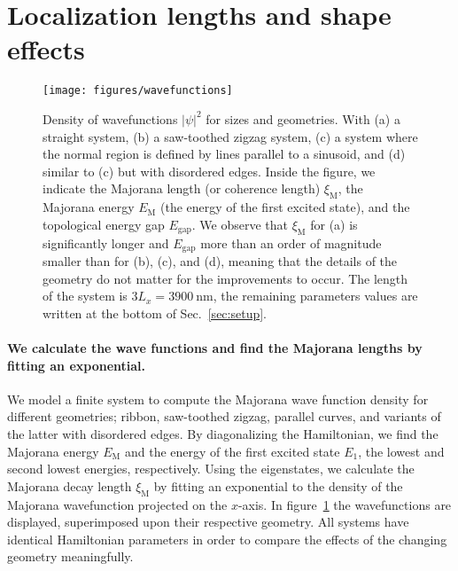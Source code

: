 \documentclass[english, twocolumn, 10pt, aps, superscriptaddress, floatfix, prb, citeautoscript]{revtex4-1}
\renewcommand{\comment}[2]{#2}
\renewcommand{\comment}{\paragraph}
\begin{document}

\section{Localization lengths and shape effects}\label{sec:shape_effects}

\begin{figure}[!htb]
\texttt{[image: figures/wavefunctions]}
\caption{Density of wavefunctions $\left|\psi\right|^2$ for sizes and geometries.
With (a) a straight system, (b) a saw-toothed zigzag system, (c) a system where the normal region is defined by lines parallel to a sinusoid, and (d) similar to (c) but with disordered edges.
Inside the figure, we indicate the Majorana length (or coherence length) $\xi_\textrm{M}$, the Majorana energy $E_\textrm{M}$ (the energy of the first excited state), and the topological energy gap $E_\textrm{gap}$.
We observe that $\xi_\textrm{M}$ for (a) is significantly longer and $E_\textrm{gap}$ more than an order of magnitude smaller than for (b), (c), and (d), meaning that the details of the geometry do not matter for the improvements to occur.
The length of the system is $3L_x=\SI{3900}{\nm}$, the remaining parameters values are written at the bottom of Sec.~\ref{sec:setup}.\label{fig:wavefunctions}}
\end{figure}

\comment{We calculate the wave functions and find the Majorana lengths by fitting an exponential.}
We model a finite system to compute the Majorana wave function density for different geometries; ribbon, saw-toothed zigzag, parallel curves, and variants of the latter with disordered edges.
By diagonalizing the Hamiltonian, we find the Majorana energy $E_\textrm{M}$ and the energy of the first excited state $E_1$, the lowest and second lowest energies, respectively.
Using the eigenstates, we calculate the Majorana decay length $\xi_\textrm{M}$ by fitting an exponential to the density of the Majorana wavefunction projected on the $x$-axis.
In figure~\ref{fig:wavefunctions} the wavefunctions are displayed, superimposed upon their respective geometry.
All systems have identical Hamiltonian parameters in order to compare the effects of the changing geometry meaningfully.
\end{document}
